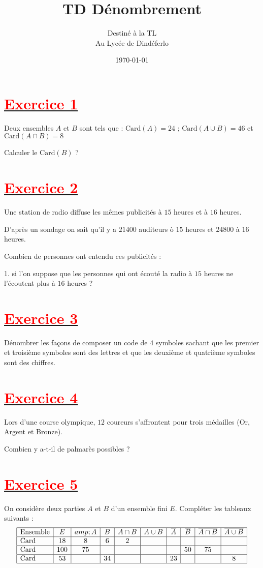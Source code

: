 \documentclass[12pt]{article}
\author{Destiné à la TL\\Au Lycée de Dindéferlo}
\title{\textbf{TD Dénombrement}}
\date{\today}
\begin{document}
\maketitle
\newpage
\section*{\underline{\textbf{\textcolor{red}{Exercice 1}}}}
Deux ensembles $A$ et $B$ sont tels que : $\text{Card}(A)=24$ ; 
$\text{Card}(A\cup B)=46$ et $\text{Card}(A\cap B)=8$

Calculer le $\text{Card}(B)$ ?
\section*{\underline{\textbf{\textcolor{red}{Exercice 2}}}}
Une station de radio diffuse les mêmes publicités à $15$ heures et à $16$ heures.

D'après un sondage on sait qu'il y a $21400$ auditeurs ò $15$ heures et $24800$ à $16$ heures.

Combien de personnes ont entendu ces publicités :

1. si l'on suppose que les personnes qui ont écouté la radio à $15$ heures ne l'écoutent plus à $16$ heures ?
\section*{\underline{\textbf{\textcolor{red}{Exercice 3}}}}
Dénombrer les façons de composer un code de $4$ symboles sachant que les premier et troisième symboles sont des lettres et que les deuxième et quatrième symboles sont des chiffres.
\section*{\underline{\textbf{\textcolor{red}{Exercice 4}}}}
Lors d'une course olympique, $12$ coureurs s'affrontent pour trois médailles (Or, Argent et Bronze).
 
Combien y a-t-il de palmarès possibles ?
\section*{\underline{\textbf{\textcolor{red}{Exercice 5}}}}
On considère deux parties $A$ et $B$ d'un ensemble fini $E.$ Compléter les tableaux suivants :
$$\begin{array}{|l|c|c|c|c|c|c|c|c|c|} \hline \text{Ensemble}&E&amp;A&B&A\cap B&A\cup B&\overline{A}&\overline{B}&\overline{A\cap B}&\overline{A\cup B}\\ \hline \text{Card}&18&8&6&2&&&&&\\ \hline \text{Card}&100&75&&&&&50&75&\\ \hline \text{Card}&53&&34&&&23&&&8\\ \hline \end{array}$$
\end{document}
